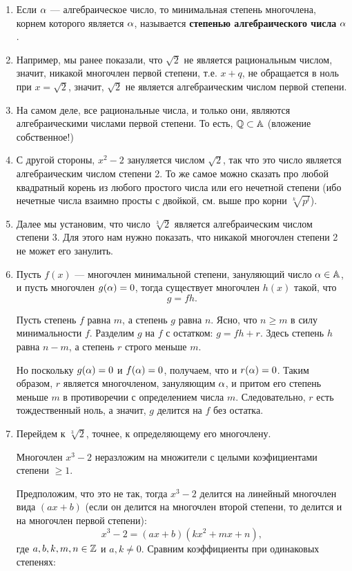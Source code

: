 \begin{enumerate}
\item Если $\alpha$ --- алгебраическое число, то минимальная степень многочлена, корнем которого является $\alpha$, называется \textbf{степенью алгебраического числа} $\alpha$.
\item Например, мы ранее показали, что $\sqrt 2$ не является рациональным числом, значит, никакой многочлен первой степени, т.е. $x+q$, не обращается в ноль при $x=\sqrt 2$, значит, $\sqrt 2$ не является алгебраическим числом первой степени. 
\item На самом деле, все рациональные числа, и только они, являются алгебраическими числами первой степени. То есть, $\mathbb Q\subset\mathbb A$ (вложение собственное!)
\item С другой стороны, $x^2-2$ зануляется числом $\sqrt 2$, так что это число является алгебраическим числом степени 2. То же самое можно сказать про любой квадратный корень из любого простого числа или его нечетной степени (ибо нечетные числа взаимно просты с двойкой, см. выше про корни $\sqrt[k]{p^l}$).
\item Далее мы установим, что число $\sqrt[3]{2}$ является алгебраическим числом степени 3. Для этого нам нужно показать, что никакой многочлен степени 2 не может его занулить.
\item
\begin{lem}\label{gfh}
Пусть $f(x)$ --- многочлен минимальной степени, зануляющий число $\alpha\in\mathbb A$, и пусть многочлен $g(\alpha)=0$, тогда существует многочлен $h(x)$ такой, что
$$
g=fh.
$$
\end{lem}
\pf
Пусть степень $f$ равна $m$, а степень $g$ равна $n$. Ясно, что $n\ge m$ в силу минимальности $f$.
Разделим $g$ на $f$ с остатком: $g=fh+r$. Здесь степень $h$ равна $n-m$, а степень $r$ строго меньше $m$.

Но поскольку $g(\alpha)=0$ и $f(\alpha)=0$, получаем, что и $r(\alpha)=0$. Таким образом, $r$ является многочленом, зануляющим $\alpha$, и притом его степень меньше $m$ в противоречии с определением числа $m$. Следовательно, $r$ есть тождественный ноль, а значит, $g$ делится на $f$ без остатка.
\epf
\item Перейдем к $\sqrt[3]{2}$, точнее, к определяющему его многочлену.
\begin{lem}
Многочлен $x^3-2$ неразложим на множители с целыми коэфициентами степени $\ge 1$.
\end{lem}
\pf Предположим, что это не так, тогда $x^3-2$ делится на линейный многочлен вида $(ax+b)$ (если он делится на многочлен второй степени, то делится и на многочлен первой степени):
$$
x^3-2 = (ax+b)(kx^2+mx+n),
$$
где $a,b,k,m,n\in\mathbb Z$ и $a,k\ne 0$. Сравним коэффициенты при одинаковых степенях:


\end{enumerate}
